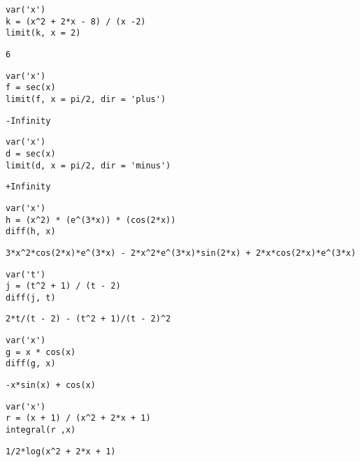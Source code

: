 \documentclass[
]{article}
\author{}
\date{}
\begin{document}
\begin{verbatim}
var('x')
k = (x^2 + 2*x - 8) / (x -2)
limit(k, x = 2)
\end{verbatim}

\begin{verbatim}
6
\end{verbatim}

\begin{verbatim}
var('x')
f = sec(x)
limit(f, x = pi/2, dir = 'plus')
\end{verbatim}

\begin{verbatim}
-Infinity
\end{verbatim}

\begin{verbatim}
var('x')
d = sec(x)
limit(d, x = pi/2, dir = 'minus')
\end{verbatim}

\begin{verbatim}
+Infinity
\end{verbatim}

\begin{verbatim}
var('x')
h = (x^2) * (e^(3*x)) * (cos(2*x))
diff(h, x)
\end{verbatim}

\begin{verbatim}
3*x^2*cos(2*x)*e^(3*x) - 2*x^2*e^(3*x)*sin(2*x) + 2*x*cos(2*x)*e^(3*x)
\end{verbatim}

\begin{verbatim}
var('t')
j = (t^2 + 1) / (t - 2)
diff(j, t)
\end{verbatim}

\begin{verbatim}
2*t/(t - 2) - (t^2 + 1)/(t - 2)^2
\end{verbatim}

\begin{verbatim}
var('x')
g = x * cos(x)
diff(g, x)
\end{verbatim}

\begin{verbatim}
-x*sin(x) + cos(x)
\end{verbatim}

\begin{verbatim}
var('x')
r = (x + 1) / (x^2 + 2*x + 1)
integral(r ,x)
\end{verbatim}

\begin{verbatim}
1/2*log(x^2 + 2*x + 1)
\end{verbatim}
\end{document}
